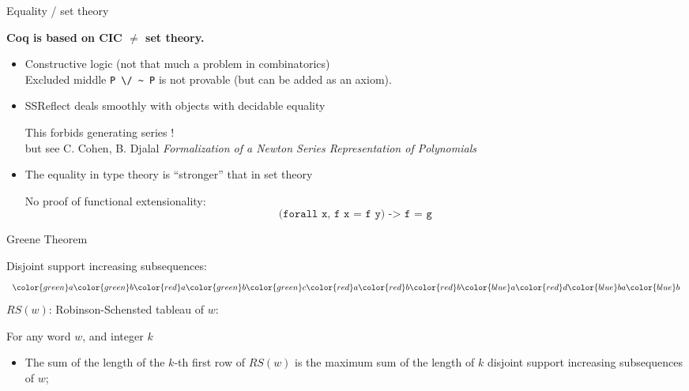 \documentclass[compress,11pt]{beamer}
\newcommand{\red}[1]{{\color{red} #1}}
\newcommand{\grn}[1]{{\color{green} #1}}
\newcommand{\blu}[1]{{\color{blue} #1}}
\begin{document}
\begin{frame}[fragile]{Equality / set theory}

  \textbf{\Large Coq is based on CIC $\neq$ set theory.}\bigskip

  \begin{itemize}
  \item Constructive logic (not that much a problem in combinatorics)\\
    Excluded middle \verb|P \/ ~ P| is not provable (but can be added as an
    axiom). \bigskip

  \item SSReflect deals smoothly with objects with decidable equality 
    \medskip

    This forbids generating series ! \\

    but see C. Cohen, B. Djalal
    \emph{Formalization of a Newton Series Representation of Polynomials}
    \bigskip

  \item The equality in type theory is ``stronger'' that in set theory

    No proof of functional extensionality:\\
    \[\texttt{(forall x, f x = f y) -> f = g}\]
  \end{itemize}
\end{frame}

\begin{frame}[fragile]{Greene Theorem}

  Disjoint support increasing subsequences:
  \[
  \begin{array}{c@{}c@{}c@{}c@{}c@{}c@{}c@{}c@{}c@{}c@{}c@{}c@{}c}
    \grn{a}&\grn{b}&\red{a}&\grn{b}&\grn{c}&\red a&\red b&\red b&\blu{a}&\red d&\blu{b}&a&\blu{b}
  \end{array}
  \]
  $RS(w)$: Robinson-Schensted tableau of $w$:
  \pause
  \begin{THEO}
    For any word $w$, and integer $k$
    \begin{itemize}
    \item The sum of the length of the $k$-th first row of $RS(w)$ is the maximum
      sum of the length of $k$ disjoint support increasing subsequences of $w$;
    \end{itemize}
  \end{THEO}
\end{frame}
\end{document}
